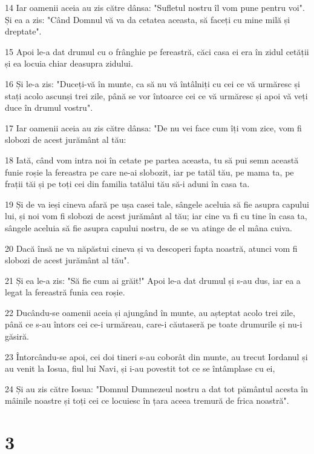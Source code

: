 \par 14 Iar oamenii aceia au zis către dânsa: "Sufletul nostru îl vom pune pentru voi". Și ea a zis: "Când Domnul vă va da cetatea aceasta, să faceți cu mine milă și dreptate".
\par 15 Apoi le-a dat drumul cu o frânghie pe fereastră, căci casa ei era în zidul cetății și ea locuia chiar deasupra zidului.
\par 16 Și le-a zis: "Duceți-vă în munte, ca să nu vă întâlniți cu cei ce vă urmăresc și stați acolo ascunși trei zile, până se vor întoarce cei ce vă urmăresc și apoi vă veți duce în drumul vostru".
\par 17 Iar oamenii aceia au zis către dânsa: "De nu vei face cum îți vom zice, vom fi slobozi de acest jurământ al tău:
\par 18 Iată, când vom intra noi în cetate pe partea aceasta, tu să pui semn această funie roșie la fereastra pe care ne-ai slobozit, iar pe tatăl tău, pe mama ta, pe frații tăi și pe toți cei din familia tatălui tău să-i aduni în casa ta.
\par 19 Și de va ieși cineva afară pe ușa casei tale, sângele aceluia să fie asupra capului lui, și noi vom fi slobozi de acest jurământ al tău; iar cine va fi cu tine în casa ta, sângele aceluia să fie asupra capului nostru, de se va atinge de el mâna cuiva.
\par 20 Dacă însă ne va năpăstui cineva și va descoperi fapta noastră, atunci vom fi slobozi de acest jurământ al tău".
\par 21 Și ea le-a zis: "Să fie cum ai grăit!" Apoi le-a dat drumul și s-au dus, iar ea a legat la fereastră funia cea roșie.
\par 22 Ducându-se oamenii aceia și ajungând în munte, au așteptat acolo trei zile, până ce s-au întors cei ce-i urmăreau, care-i căutaseră pe toate drumurile și nu-i găsiră.
\par 23 Întorcându-se apoi, cei doi tineri s-au coborât din munte, au trecut Iordanul și au venit la Iosua, fiul lui Navi, și i-au povestit tot ce se întâmplase cu ei,
\par 24 Și au zis către Iosua: "Domnul Dumnezeul nostru a dat tot pământul acesta în mâinile noastre și toți cei ce locuiesc în țara aceea tremură de frica noastră".

\chapter{3}

